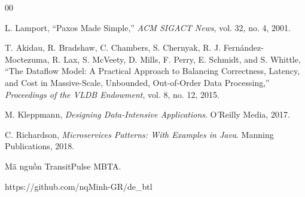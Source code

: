 \begin{thebibliography}{00}

L. Lamport,
``Paxos Made Simple,''
\textit{ACM SIGACT News}, vol. 32, no. 4, 2001.


T. Akidau, R. Bradshaw, C. Chambers, S. Chernyak, R. J. Fernández-Moctezuma, R. Lax, S. McVeety, D. Mills,
F. Perry, E. Schmidt, and S. Whittle,
``The Dataflow Model: A Practical Approach to Balancing Correctness, Latency, and Cost in Massive-Scale,
Unbounded, Out-of-Order Data Processing,''
\textit{Proceedings of the VLDB Endowment}, vol. 8, no. 12, 2015.


M. Kleppmann,
\textit{Designing Data-Intensive Applications}.
O'Reilly Media, 2017.


C. Richardson,
\textit{Microservices Patterns: With Examples in Java}.
Manning Publications, 2018.


Mã nguồn TransitPulse MBTA.

https://github.com/nqMinh-GR/de\_btl

\end{thebibliography}
